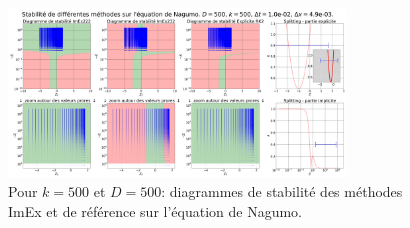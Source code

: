     \begin{figure}[htbp]
        \centering
        \includegraphics[width=0.8\textwidth]{media/4_travail/2_nagumo/stabilite/STABILITE_D500_k500_dt1.0e-02_dx4.9e-03.png}
        \caption{Pour $k=500$ et $D=500$: diagrammes de stabilité des méthodes ImEx et de référence sur l'équation de Nagumo.}
        \label{fig:stabilite_nagumo_cas_special}
    \end{figure}